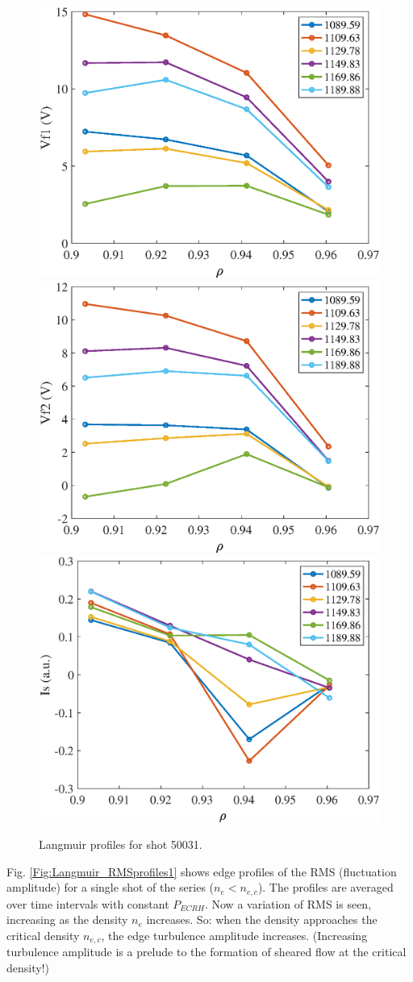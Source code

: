 \documentclass[preprint,12pt,authoryear]{elsarticle}
\begin{document}
\begin{figure}[!ht]
\centering
   \includegraphics[width=0.32\columnwidth]{Images/50031_VF1_.eps}
   \includegraphics[width=0.32\columnwidth]{Images/50031_VF2_.eps}
   \includegraphics[width=0.32\columnwidth]{Images/50031_Is_.eps}
   \caption{Langmuir profiles for shot 50031.}
   \label{Fig:Langmuir_profiles1}
\end{figure}

Fig. \ref{Fig:Langmuir_RMSprofiles1} shows edge profiles of the RMS (fluctuation amplitude) for a single shot of the series ($n_e < n_{e,c}$).
The profiles are averaged over time intervals with constant $P_{ECRH}$.
Now a variation of RMS is seen, increasing as the density $n_e$ increases.
So: when the density approaches the critical density $n_{e,c}$, the edge turbulence amplitude increases.
(Increasing turbulence amplitude is a prelude to the formation of sheared flow at the critical density!)
\end{document}
